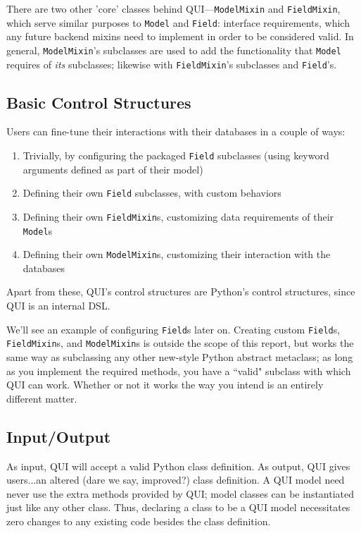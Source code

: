 \documentclass{article} %
\newcommand{\il}[1]{\mbox{\lstinline{#1}}}
\begin{document}
There are two other 'core' classes behind QUI---\il{ModelMixin} and \il{FieldMixin}, which serve similar purposes to \il{Model} and \il{Field}: interface
 requirements, which any future backend mixins need to implement in order to be considered valid. In general, \il{ModelMixin}'s subclasses are used
to add the functionality that \il{Model} requires of \emph{its} subclasses; likewise with \il{FieldMixin}'s subclasses and \il{Field}'s.

\subsection{Basic Control Structures}
Users can fine-tune their interactions with their databases in a couple of ways:
\begin{enumerate}
\item Trivially, by configuring the packaged \il{Field} subclasses (using keyword arguments defined as part of their model)
\item Defining their own \il{Field} subclasses, with custom behaviors
\item Defining their own \il{FieldMixin}s, customizing data requirements of their \il{Model}s
\item Defining their own \il{ModelMixin}s, customizing their interaction with the databases
\end{enumerate}
Apart from these, QUI's control structures are Python's control structures, since QUI is an internal DSL.

We'll see an example of configuring \il{Field}s later on. Creating custom \il{Field}s, \il{FieldMixin}s, and \il{ModelMixin}s is outside the scope of this report,
but works the same way as subclassing any other new-style Python abstract metaclass; as long as you implement the required methods, you have a ``valid"
subclass with which QUI can work. Whether or not it works the way you intend is an entirely different matter.

\subsection{Input/Output}
As input, QUI will accept a valid Python class definition. As output, QUI gives users...an altered (dare we say, improved?) class definition.
A QUI model need never use the extra methods provided by QUI; model classes can be instantiated just like any other class. Thus, declaring
a class to be a QUI model necessitates zero changes to any existing code besides the class definition.
\end{document}
